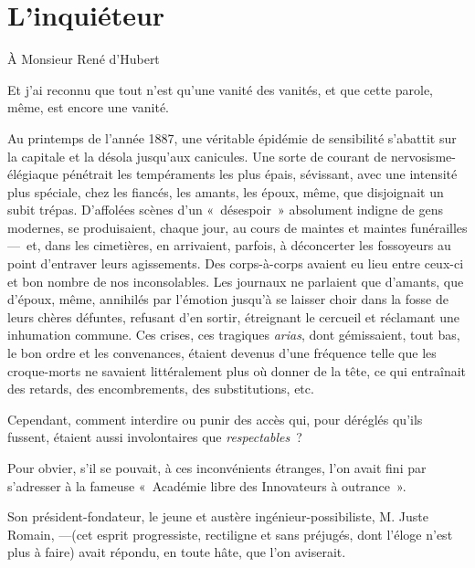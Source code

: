 \documentclass[french,twoside]{book} %
\newcommand{\bibl}[1]{{\RaggedLeft{#1}\par\bigskip}}
\begin{document}
 \section[{L’inquiéteur}]{L’inquiéteur}\renewcommand{\leftmark}{L’inquiéteur}


\begin{center}
\noindent \centerline{À Monsieur René d’Hubert}\par
\end{center}

\bigbreak
\noindent Et j’ai reconnu que tout n’est qu’une vanité des vanités, et que cette parole, même, est encore une vanité.\par

\bibl{L’Ecclésiaste.}
\noindent Au printemps de l’année 1887, une véritable épidémie de sensibilité s’abattit sur la capitale et la désola jusqu’aux canicules. Une sorte de courant de nervosisme-élégiaque pénétrait les tempéraments les plus épais, sévissant, avec une intensité plus spéciale, chez les fiancés, les amants, les époux, même, que disjoignait un subit trépas. D’affolées scènes d’un « désespoir » absolument indigne de gens modernes, se produisaient, chaque jour, au cours de maintes et maintes funérailles— et, dans les cimetières, en arrivaient, parfois, à déconcerter les fossoyeurs au point d’entraver leurs agissements.   Des corps-à-corps avaient eu lieu entre ceux-ci et bon nombre de nos inconsolables. Les journaux ne parlaient que d’amants, que d’époux, même, annihilés par l’émotion jusqu’à se laisser choir dans la fosse de leurs chères défuntes, refusant d’en sortir, étreignant le cercueil et réclamant une inhumation commune. Ces crises, ces tragiques \emph{arias}, dont gémissaient, tout bas, le bon ordre et les convenances, étaient devenus d’une fréquence telle que les croque-morts ne savaient littéralement plus où donner de la tête, ce qui entraînait des retards, des encombrements, des substitutions, etc.\par
Cependant, comment interdire ou punir des accès qui, pour déréglés qu’ils fussent, étaient aussi involontaires que \emph{respectables} ?\par
Pour obvier, s’il se pouvait, à ces inconvénients étranges, l’on avait fini par s’adresser à la fameuse « Académie libre des Innovateurs à outrance ».\par
Son président-fondateur, le jeune et austère ingénieur-possibiliste, M. Juste Romain, —(cet esprit progressiste, rectiligne et sans   préjugés, dont l’éloge n’est plus à faire) avait répondu, en toute hâte, que l’on aviserait.\par
\end{document}
